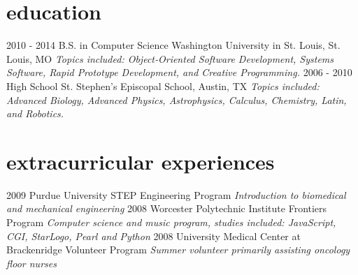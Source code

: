 \documentclass[]{cv}
\begin{document}
\section{education}

\begin{entrylist}
  \entry
    {2010 - 2014}
    {B.S. in Computer Science}
    {Washington University in St. Louis, St. Louis, MO}
    {\emph{Topics included: Object‐Oriented Software Development, Systems Software, Rapid Prototype Development, and Creative Programming.}}
  \entry
    {2006 - 2010}
    {High School}
    {St. Stephen’s Episcopal School, Austin, TX}
    {\emph{Topics included: Advanced Biology, Advanced Physics, Astrophysics, Calculus, Chemistry, Latin, and Robotics.}}
\end{entrylist}

\section{extracurricular experiences}

\begin{entrylist}
  \entry
    {2009}
    {Purdue University STEP Engineering Program}{}
    {\emph{Introduction to biomedical and mechanical engineering}}
  \entry
    {2008}
    {Worcester Polytechnic Institute Frontiers Program}{}
    {\emph{Computer science and music program, studies included: JavaScript, CGI, StarLogo, Pearl and Python}}
  \entry
    {2008}
    {University Medical Center at Brackenridge Volunteer Program}{}
    {\emph{Summer volunteer primarily assisting oncology floor nurses}}
\end{entrylist}
\end{document}
